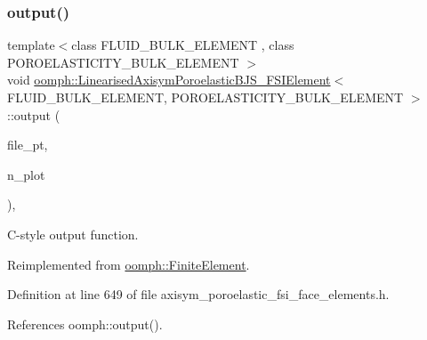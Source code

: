 \subsubsection{\texorpdfstring{output()}{output()}\hspace{0.1cm}{\footnotesize\ttfamily [4/4]}}
{\footnotesize\ttfamily template$<$class F\+L\+U\+I\+D\+\_\+\+B\+U\+L\+K\+\_\+\+E\+L\+E\+M\+E\+NT , class P\+O\+R\+O\+E\+L\+A\+S\+T\+I\+C\+I\+T\+Y\+\_\+\+B\+U\+L\+K\+\_\+\+E\+L\+E\+M\+E\+NT $>$ \\
void \hyperlink{classoomph_1_1LinearisedAxisymPoroelasticBJS__FSIElement}{oomph\+::\+Linearised\+Axisym\+Poroelastic\+B\+J\+S\+\_\+\+F\+S\+I\+Element}$<$ F\+L\+U\+I\+D\+\_\+\+B\+U\+L\+K\+\_\+\+E\+L\+E\+M\+E\+NT, P\+O\+R\+O\+E\+L\+A\+S\+T\+I\+C\+I\+T\+Y\+\_\+\+B\+U\+L\+K\+\_\+\+E\+L\+E\+M\+E\+NT $>$\+::output (\begin{DoxyParamCaption}\item[{F\+I\+LE $\ast$}]{file\+\_\+pt,  }\item[{const unsigned \&}]{n\+\_\+plot }\end{DoxyParamCaption})\hspace{0.3cm}{\ttfamily [inline]}, {\ttfamily [virtual]}}



C-\/style output function. 



Reimplemented from \hyperlink{classoomph_1_1FiniteElement_adfaee690bb0608f03320eeb9d110d48c}{oomph\+::\+Finite\+Element}.



Definition at line 649 of file axisym\+\_\+poroelastic\+\_\+fsi\+\_\+face\+\_\+elements.\+h.



References oomph\+::output().

\mbox{\label{classoomph_1_1LinearisedAxisymPoroelasticBJS__FSIElement_a7b0a7d3c7c5e8f98741ae725b4a03f04}} 
